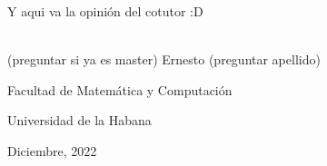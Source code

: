 \begin{co_opinion}
    Y aqui va la opinión del cotutor :D

    \vspace{1cm}


    \begin{flushright}
        \underline{\hspace{6.5cm}}\\
        (preguntar si ya es master) Ernesto (preguntar apellido)

        Facultad de Matemática y Computación

        Universidad de la Habana

        Diciembre, 2022
    \end{flushright}

\end{co_opinion}